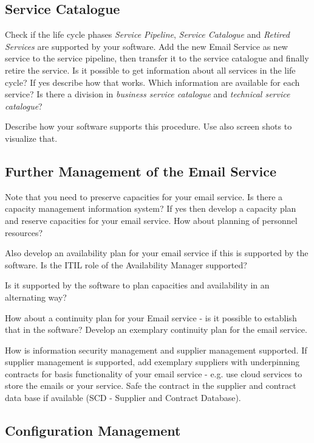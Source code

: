 \subsection{Service Catalogue}
\label{sec:serviceCatalogue}

Check if the life cycle phases \emph{Service Pipeline}, \emph{Service Catalogue} and \emph{Retired Services} are supported by your software. Add the new Email Service as new service to the service pipeline, then transfer it to the service catalogue and finally retire the service. Is it possible to get information about all services in the life cycle? If yes describe how that works. Which information are available for each service? Is there a division in \emph{business service catalogue} and \emph{technical service catalogue}?

Describe how your software supports this procedure. Use also screen shots to visualize that.

\subsection{Further Management of the Email Service}
\label{sec:furtherManagement}

Note that you need to preserve capacities for your email service. Is there a capacity management information system? If yes then develop a capacity plan and  reserve capacities for your email service. How about planning of personnel resources?

Also develop an availability plan for your email service if this is supported by the software. Is the ITIL role of the Availability Manager supported?

Is it supported by the software to plan capacities and availability in an alternating way?

How about a continuity plan for your Email service - is it possible to establish that in the software? Develop an exemplary continuity plan for the email service.

How is information security management and supplier management supported. If supplier management is supported, add exemplary suppliers with underpinning contracts for basis functionality of your email service - e.g. use cloud services to store the emails or your service. Safe the contract in the supplier and contract data base if available (SCD - Supplier and Contract Database).

\subsection{Configuration Management}
\label{sec:configurationManagement}

